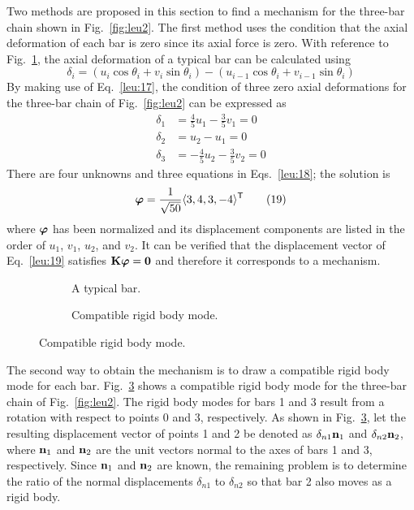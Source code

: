 Two methods are proposed in this section to find a mechanism for the three-bar chain shown in Fig.~\ref{fig:leu2}. The first method uses the condition that the axial deformation of each bar is zero since its axial force is zero. With reference to Fig.~\ref{fig:leu3}, the axial deformation of a typical bar can be calculated using
\begin{equation}
  \delta_i = (u_i\cos\theta_i + v_i\sin\theta_i) - (u_{i-1}\cos\theta_i + v_{i-1}\sin\theta_i) \tag{17}\label{leu:17}
\end{equation}
By making use of Eq.~\eqref{leu:17}, the condition of three zero axial deformations for the three-bar chain of Fig.~\ref{fig:leu2} can be expressed as
\begin{equation}
  \begin{aligned}
    \delta_1 &= \tfrac45 u_1 - \tfrac35 v_1 = 0\\
    \delta_2 &= u_2 - u_1 = 0\\
    \delta_3 &= -\tfrac45 u_2 - \tfrac35 v_2 = 0
  \end{aligned} \tag{18a,b,c}\label{leu:18}
\end{equation}
There are four unknowns and three equations in Eqs.~\eqref{leu:18}; the solution is
\begin{equation}
  \bm{\varphi} = \frac{1}{\sqrt{50}}\langle 3, 4, 3, -4\rangle^{\mathsf{T}} \tag{19}\label{leu:19}
\end{equation}
where $\bm{\varphi}$ has been normalized and its displacement components are listed in the order of $u_1$, $v_1$, $u_2$, and $v_2$. It can be verified that the displacement vector of Eq.~\eqref{leu:19} satisfies $\mathbf{K}\bm{\varphi} = \mathbf{0}$ and therefore it corresponds to a mechanism.

\begin{figure}[H]
  \centering
  \begin{subfigure}[b]{0.4\textwidth}\centering
    \caption{A typical bar.}\label{fig:leu3}\end{subfigure}\hfill
  \begin{subfigure}[b]{0.55\textwidth}\centering
    \caption{Compatible rigid body mode.}\label{fig:leu4}\end{subfigure}
\end{figure}

The second way to obtain the mechanism is to draw a compatible rigid body mode for each bar. Fig.~\ref{fig:leu4} shows a compatible rigid body mode for the three-bar chain of Fig.~\ref{fig:leu2}. The rigid body modes for bars 1 and 3 result from a rotation with respect to points 0 and 3, respectively. As shown in Fig.~\ref{fig:leu4}, let the resulting displacement vector of points 1 and 2 be denoted as $\delta_{n1}\mathbf{n}_1$ and $\delta_{n2}\mathbf{n}_2$, where $\mathbf{n}_1$ and $\mathbf{n}_2$ are the unit vectors normal to the axes of bars 1 and 3, respectively. Since $\mathbf{n}_1$ and $\mathbf{n}_2$ are known, the remaining problem is to determine the ratio of the normal displacements $\delta_{n1}$ to $\delta_{n2}$ so that bar 2 also moves as a rigid body.

